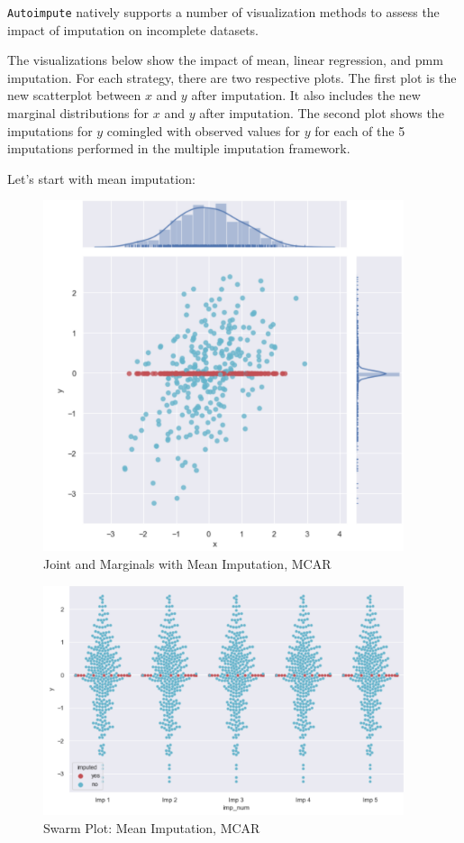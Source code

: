 \documentclass[12pt,oneside]{chicagocapstone}
\begin{document}
\texttt{Autoimpute} natively supports a number of visualization methods
to assess the impact of imputation on incomplete datasets.

The visualizations below show the impact of mean, linear regression, and
pmm imputation. For each strategy, there are two respective plots. The
first plot is the new scatterplot between \(x\) and \(y\) after
imputation. It also includes the new marginal distributions for \(x\)
and \(y\) after imputation. The second plot shows the imputations for
\(y\) comingled with observed values for \(y\) for each of the 5
imputations performed in the multiple imputation framework.

Let's start with mean imputation:
\begin{figure}

{\centering \includegraphics[width=400px]{figure/multi-mean} 

}

\caption{Joint and Marginals with Mean Imputation, MCAR}\label{fig:multi-mean}
\end{figure}
\begin{figure}

{\centering \includegraphics[width=400px]{figure/swarm-mean} 

}

\caption{Swarm Plot: Mean Imputation, MCAR}\label{fig:swarm-mean}
\end{figure}
\end{document}
